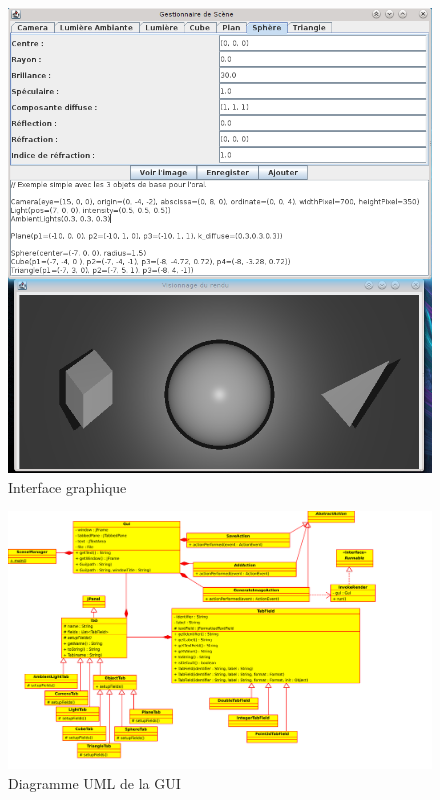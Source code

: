 \documentclass[a4paper]{article}
\begin{document}
    \begin{figure}[p]
      \centerline{\includegraphics[width=1.2\textwidth]{screen2.png}}
    \caption{Interface graphique\label{fig:gui}}
    \end{figure}
    \begin{figure}[p]
      \centerline{\includegraphics[width=1.2\textwidth]{guiuml.pdf}}
      \caption{Diagramme UML de la GUI\label{fig:guiuml}}
    \end{figure}
\end{document}
